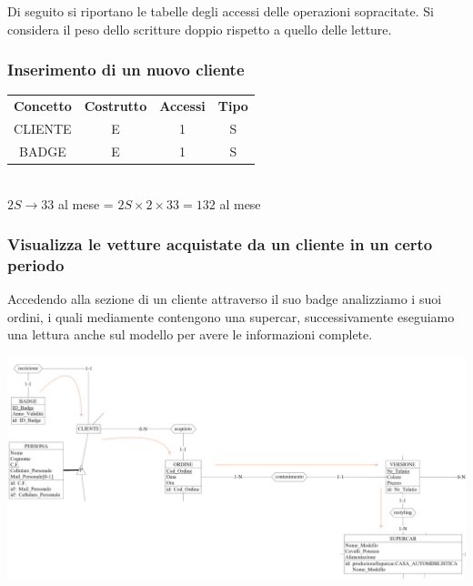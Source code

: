 \documentclass[12pt]{article}
\begin{document}
Di seguito si riportano le tabelle degli accessi delle operazioni sopracitate.
Si considera il peso dello scritture doppio rispetto a quello delle letture.

\subsubsection{Inserimento di un nuovo cliente} \label{Inserimento di un nuovo cliente}

\begin{table}[H]
    \centering
    \begin{tabular}{ c c c c }
        \rowcolor{red!20!}
        \textbf{Concetto} & \textbf{Costrutto} & \textbf{Accessi} &
        \textbf{Tipo}\\
        CLIENTE & E & 1 & S \\
        BADGE & E & 1 & S \\
    \end{tabular}\\
    \( 2S \rightarrow 33 \) al mese = \( 2S \times 2 \times 33 = 132 \) al mese
\end{table}

\subsubsection{Visualizza le vetture acquistate da un cliente in un certo
periodo} \label{Visualizza le vetture acquistate da un cliente in un certo
periodo}

Accedendo alla sezione di un cliente attraverso il suo badge analizziamo i suoi
ordini, i quali mediamente contengono una supercar, successivamente eseguiamo
una lettura anche sul modello per avere le informazioni complete.

\begin{center}
    \includegraphics[scale=0.40]{images/acquistiCliente.png}
\end{center}
\end{document}
